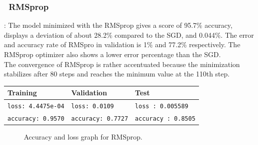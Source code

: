 \documentclass[lnbip]{svmultln}
\begin{document}
	
	\subsubsection*{\qquad \textbullet \ \textbf{RMSprop}}:
	The model minimized with the RMSprop gives a score of 95.7\% accuracy, displays a deviation of about 28.2\% compared to the SGD, and 0.044\%. The error and accuracy rate of RMSpro in validation is 1\% and 77.2\% respectively. The RMSprop optimizer also shows a lower error percentage than the SGD.\\
	The convergence of RMSprop is rather accentuated because the minimization stabilizes after 80 steps and reaches the minimum value at the 110th step.
	\begin{table}[H]
		\centering
		\begin{tabular}{l|l|l}
			\hline
			\textbf{Training} & \textbf{Validation} & \textbf{Test} \\
			\hline
			
			\texttt{loss: 4.4475e-04} & \texttt{loss: 0.0109} & \texttt{loss : 0.005589} \\
			\texttt{accuracy: 0.9570} & \texttt{accuracy: 0.7727} & \texttt{accuracy : 0.8505} \\
			
			\hline
			
		\end{tabular}
	\end{table}
	\begin{figure}[H]
		
		 \quad
		
		\caption{Accuracy and loss graph for RMSprop.}
		\label{fig:1}
	\end{figure}
	
\end{document}
